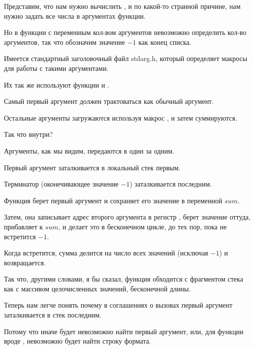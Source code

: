 
Представим, что нам нужно вычислить , 
и по какой-то странной причине, 
нам нужно задать все числа в аргументах функции.

Но в \CCpp функции с переменным кол-вом аргументов невозможно определить кол-во аргументов,
так что обозначим значение $-1$ как конец списка.%


Имеется стандартный заголовочный файл stdarg.h, который определяет макросы для работы с такими аргументами.

Их так же используют функции \printf и \scanf.



Самый первый аргумент должен трактоваться как обычный аргумент.

Остальные аргументы загружаются используя макрос , и затем суммируются.

Так что внутри?




Аргументы, как мы видим, передаются в \main один за одним.

Первый аргумент заталкивается в локальный стек первым.

Терминатор (оконечивающее значение $-1$) заталкивается последним.

Функция  берет первый аргумент и сохраняет его значение в переменной $sum$.

Затем, она записывает адрес второго аргумента в регистр \EDX, берет значение оттуда, прибавляет к $sum$,
и делает это в бесконечном цикле, до тех пор, пока не встретится $-1$.

Когда встретится, сумма делится на число всех значений (исключая $-1$) и  
возвращается.

Так что, другими словами, я бы сказал, функция обходится с фрагментом стека как с массивом целочисленных
значений, бесконечной длины.

Теперь нам легче понять почему в соглашениях о вызовах  первый аргумент 
заталкивается в стек последним.

Потому что иначе будет невозможно найти первый аргумент, или, для функции вроде \printf, невозможно
будет найти строку формата.

